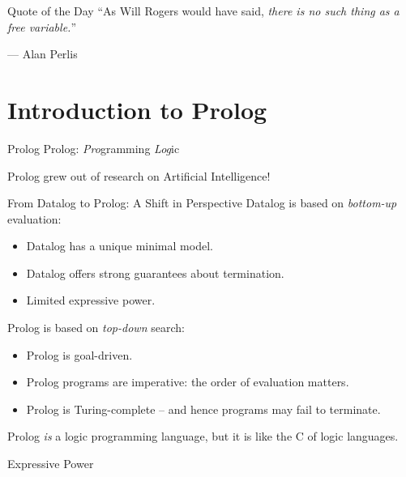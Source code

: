 \begin{frame}{Quote of the Day}
``As Will Rogers would have said, \emph{there is no such thing as a free variable.}''

\begin{flushright}
--- Alan Perlis
\end{flushright}
\end{frame}



\section{Introduction to Prolog}

\begin{frame}{Prolog}
\Large
Prolog: \emph{Pro}gramming \emph{Log}ic

\pause

\bigskip

Prolog grew out of research on Artificial Intelligence!
\end{frame}    

\begin{frame}{From Datalog to Prolog: A Shift in Perspective}
Datalog is based on \emph{bottom-up} evaluation:

\begin{itemize}
    \item Datalog has a unique minimal model.
    \item Datalog offers strong guarantees about termination.
    \item Limited expressive power.
\end{itemize}

Prolog is based on \emph{top-down} search:

\begin{itemize}
    \item Prolog is goal-driven.
    \item Prolog programs are imperative: the order of evaluation matters.
    \item Prolog is Turing-complete -- and hence programs may fail to terminate.
\end{itemize}

Prolog \emph{is} a logic programming language, but it is like the C of logic languages.
\end{frame}

\begin{frame}{Expressive Power}
\centering
\medskip
\medskip
{}
\end{frame}

